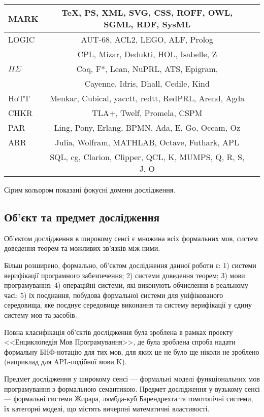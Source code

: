 \begin{table}[ht]
\begin{tabular}{lcc}
    \hline
       MARK & TeX, PS, XML, SVG, CSS, ROFF, OWL, SGML, RDF, SysML \\
    \hline
       LOGIC & AUT-68, ACL2, LEGO, ALF, Prolog \\
             & CPL, Mizar, Dedukti, HOL, Isabelle, Z \\
    \hline
\rowcolor{LightGray}
       $\Pi\Sigma$ & Coq, F*, Lean, NuPRL, ATS, Epigram, \\
\rowcolor{LightGray}
          & Cayenne, Idris, Dhall, Cedile, Kind \\
    \hline
\rowcolor{LightGray}
       HoTT & Menkar, Cubical, yacctt, redtt, RedPRL, Arend, Agda \\
    \hline
\rowcolor{LightGray25}
       CHKR & TLA+, Twelf, Promela, CSPM \\
    \hline
\rowcolor{LightGray}
       PAR & Ling, Pony, Erlang, BPMN, Ada, E, Go, Occam, Oz \\
    \hline
\rowcolor{LightGray}
       ARR & Julia, Wolfram, MATHLAB, Octave, Futhark, APL \\
\rowcolor{LightGray}
           & SQL, cg, Clarion, Clipper, QCL, K, MUMPS, Q, R, S, J, O \\
    \hline
  \end{tabular}
\small Сірим кольором показані фокусні домени дослідження.
\end{table}

\subsection{Об'єкт та предмет дослідження}
Об'єктом дослідження в широкому сенсі є множина
всіх формальних мов, систем доведення теорем та можливих зв'язків між ними.

Більш розширено, формально, об'єктом дослідження данної роботи є:
1) системи верифікації програмного забезпечення;
2) системи доведення теорем;
3) мови програмування;
4) операційні системи, які виконують обчислення в реальному часі;
5) їх поєднання, побудова формальної системи для
уніфікованого середовища, яке поєднує середовище
виконання та систему верифікації у єдину систему мов та засобів.

Повна класифікація об'єктів дослідження була зроблена в рамках проекту
<<Енциклопедія Мов Програмування>>, де була зроблена спроба надати
формальну БНФ-нотацію для тих мов, для яких це не було ще ніколи
не зроблено (наприклад для APL-подібної мови K).

Предмет дослідження у широкому сенсі --- формальні моделі функціональних
мов програмування з формальною семантикою. Предмет дослідження у
вузькому сенсі --- формальні системи Жирара, лямбда-куб Барендрехта
та гомотопічні системи, їх категорні моделі, що містять вичерпні
математичні властивості.


